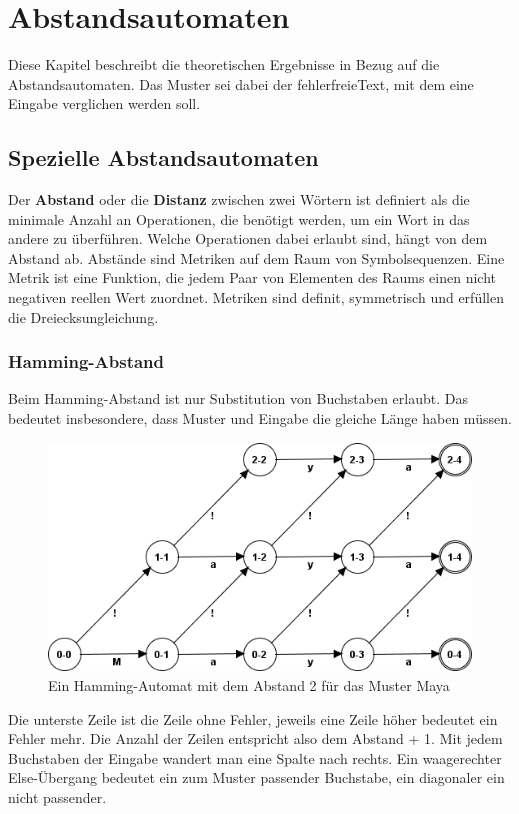 \chapter{Abstandsautomaten}\label{Abstandsautomaten}
Diese Kapitel beschreibt die theoretischen Ergebnisse in Bezug auf die Abstandsautomaten. Das Muster sei dabei der \glqq fehlerfreie\grqq Text, mit dem eine Eingabe verglichen werden soll.
\section{Spezielle Abstandsautomaten}
Der \textbf{Abstand} oder die \textbf{Distanz} zwischen zwei Wörtern ist definiert als die minimale Anzahl an Operationen, die benötigt werden, um ein Wort in das andere zu überführen. Welche Operationen dabei erlaubt sind, hängt von dem Abstand ab. Abstände sind Metriken auf dem Raum von Symbolsequenzen. Eine Metrik ist eine Funktion, die jedem Paar von Elementen des Raums einen nicht negativen reellen Wert zuordnet. Metriken sind definit, symmetrisch und erfüllen die Dreiecksungleichung.
\subsection{Hamming-Abstand}
Beim Hamming-Abstand ist nur Substitution von Buchstaben erlaubt. Das bedeutet insbesondere, dass Muster und Eingabe die gleiche Länge haben müssen.

\begin{figure}[!htb]
\centering
\includegraphics[scale=0.7]{pic/automata/hamming}%
\caption{Ein Hamming-Automat mit dem Abstand 2 für das Muster Maya}%
\end{figure}
Die unterste Zeile ist die Zeile ohne Fehler, jeweils eine Zeile höher bedeutet ein Fehler mehr. Die Anzahl der Zeilen entspricht also dem Abstand + 1. Mit jedem Buchstaben der Eingabe wandert man eine Spalte nach rechts. Ein waagerechter Else-Übergang bedeutet ein zum Muster passender Buchstabe, ein diagonaler ein nicht passender.
